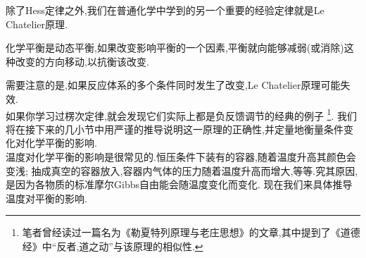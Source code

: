 \documentclass{ctexart}
\begin{document}
\indent 除了Hess定律之外,我们在普通化学中学到的另一个重要的经验定律就是Le Chatelier原理.%
\begin{theorem}[5B.2.1 Le Chatelier原理]
    化学平衡是动态平衡,如果改变影响平衡的一个因素,平衡就向能够减弱(或消除)这种改变的方向移动,以抗衡该改变.
\end{theorem}
需要注意的是,如果反应体系的多个条件同时发生了改变,Le Chatelier原理可能失效.\\
\indent 如果你学习过楞次定律,就会发现它们实际上都是负反馈调节的经典的例子%
\footnote{笔者曾经读过一篇名为《勒夏特列原理与老庄思想》的文章,其中提到了《道德经》中“反者,道之动”与该原理的相似性.}.%
我们将在接下来的几小节中用严谨的推导说明这一原理的正确性,并定量地衡量条件变化对化学平衡的影响.\vspace{4pt}\\
\indent 温度对化学平衡的影响是很常见的.恒压条件下装有的容器,随着温度升高其颜色会变浅;%
抽成真空的容器放入,容器内气体的压力随着温度升高而增大,等等.究其原因,是因为各物质的标准摩尔Gibbs自由能会随温度变化而变化.%
现在我们来具体推导温度对平衡的影响.
\end{document}
